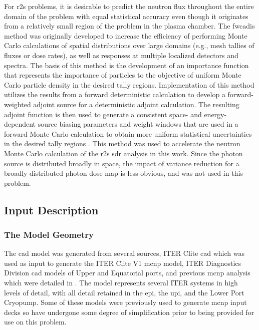 \documentclass[12pt]{article}
\begin{document}
For \gls{r2s} problems, it is desirable to predict the neutron flux throughout
the entire domain of the problem with equal statistical accuracy even though
it originates from a relatively small region of the problem in the plasma
chamber.  The \gls{fwcadis} method was originally developed to increase the
efficiency of performing Monte Carlo calculations of spatial distributions
over large domains (e.g., mesh tallies of fluxes or dose rates), as well as
responses at multiple localized detectors and spectra. The basis of this
method is the development of an importance function that represents the
importance of particles to the objective of uniform Monte Carlo particle
density in the desired tally regions.  Implementation of this method utilizes
the results from a forward deterministic calculation to develop a
forward-weighted adjoint source for a deterministic adjoint calculation. The
resulting adjoint function is then used to generate a consistent space- and
energy-dependent source biasing parameters and weight windows that are used in
a forward Monte Carlo calculation to obtain more uniform statistical
uncertainties in the desired tally regions \cite{wagnerNSEFWCADIS}. This
method was used to accelerate the neutron Monte Carlo calculation of
the \gls{r2s} \gls{sdr} analysis in this work.  Since the photon source is
distributed broadly in space, the impact of variance reduction for a broadly
distributed photon dose map is less obvious, and was not used in this problem.

\subsection{Input Description}
\subsubsection{The Model Geometry}
The \gls{cad} model was generated from several sources, ITER Clite \gls{cad}
which was used as input to generate the ITER Clite V1 \gls{mcnp} model, ITER
Diagnostics Division \gls{cad} models of Upper and Equatorial ports, and
previous \gls{mcnp} analysis which were detailed in \cite{cad_origination}. The
model represents several ITER systems in high levels of detail, with all detail
retained in the \gls{epi}, the  \gls{upi}, and the Lower Port Cryopump. Some of
these models were previously used to generate \gls{mcnp} input decks so have
undergone some degree of simplification prior to being provided for use on this 
problem.
\\
\end{document}

